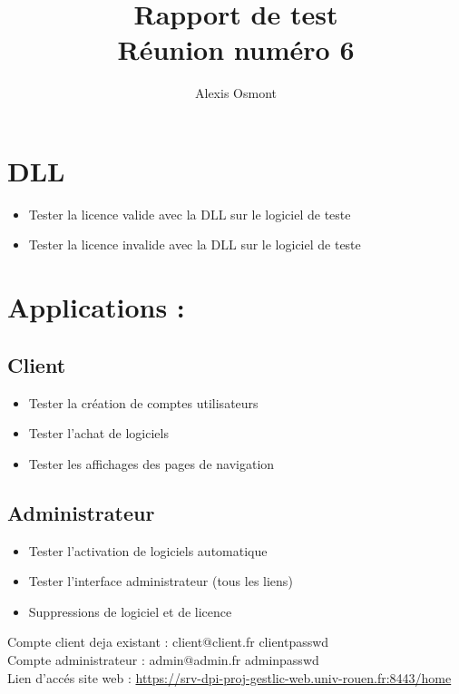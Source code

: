 \documentclass{article}
\title{
    \Huge
    Rapport de test\\
    Réunion numéro 6\\
}
\author{\huge Alexis Osmont\\}
\begin{document}
\maketitle
\vspace{5cm}
\newpage

\section{DLL}   

\begin{itemize}
  \item Tester la licence valide avec la DLL sur le logiciel de teste
  \item Tester la licence invalide avec la DLL sur le logiciel de teste
\end{itemize}

\section{Applications :}
\subsection{Client}

\begin{itemize}
  \item Tester la création de comptes utilisateurs
  \item Tester l'achat de logiciels
  \item Tester les affichages des pages de navigation
\end{itemize}

\subsection{Administrateur}

\begin{itemize}
  \item Tester l'activation de logiciels automatique
  \item Tester l'interface administrateur (tous les liens)
  \item Suppressions de logiciel et de licence\newline
\end{itemize}
Compte client deja existant : client@client.fr clientpasswd\\
Compte administrateur : admin@admin.fr adminpasswd\\

Lien d'accés site web : \href{https://srv-dpi-proj-gestlic-web.univ-rouen.fr:8443/home}{https://srv-dpi-proj-gestlic-web.univ-rouen.fr:8443/home}
\end{document}
